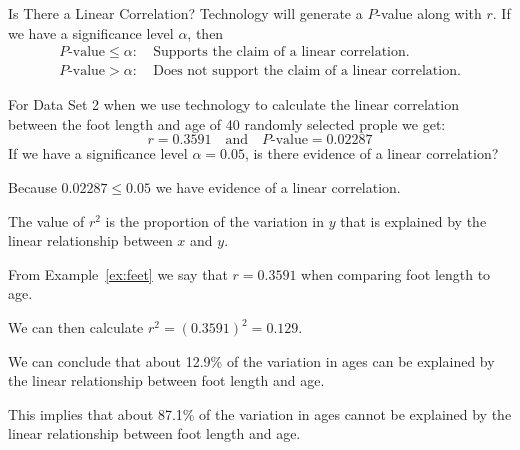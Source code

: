 \documentclass{beamer}
\begin{document}
\begin{frame}
\begin{block}{Is There a Linear Correlation?}
Technology will generate a $P$-value along with $r$. If we have a significance level $\alpha$, then
\begin{equation*}
\begin{aligned}
\text{$P$-value}\leq \alpha:& ~\text{Supports the claim of a linear correlation.}\\
\text{$P$-value}> \alpha:& ~\text{Does not support the claim of a linear correlation.}
\end{aligned}
\end{equation*}
\end{block}\pause

\begin{example}\label{ex:feet}
For Data Set 2  when we use technology to calculate the linear correlation between the foot length and age of 40 randomly selected prople we get:
\begin{equation*}
r=0.3591\quad\text{and}\quad P\text{-value}=0.02287
\end{equation*}\pause
If we have a significance level $\alpha=0.05$, is there evidence of a linear correlation?\pause

\vspace{1mm}
Because $0.02287\leq 0.05$ we have evidence of a linear correlation.
\end{example}
\end{frame}

\begin{frame}
\begin{note}
The value of $r^2$ is the proportion of the variation in $y$ that is explained by the linear relationship between $x$ and $y$.
\end{note}\pause

\begin{example}
From Example~\ref{ex:feet} we say that $r=0.3591$ when comparing foot length to age.\pause

\vspace{2mm}
We can then calculate $r^2={(0.3591)}^2=0.129$.\pause

\vspace{2mm}
We can conclude that about 12.9\% of the variation in ages can be explained by the linear relationship between foot length and age.\pause

\vspace{2mm}
This implies that about 87.1\% of the variation in ages cannot be explained by the linear relationship between foot length and age.
\end{example}
\end{frame}
\end{document}
